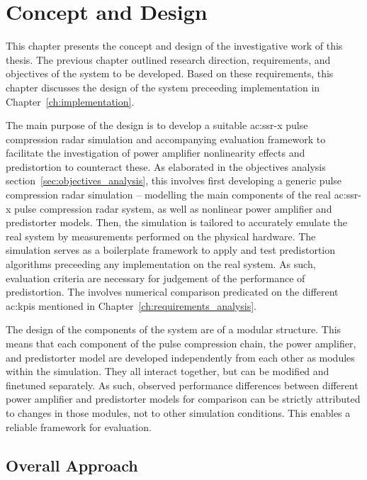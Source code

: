 %
\chapter{Concept and Design}\label{ch:concept_and_design}

This chapter presents the concept and design of the investigative work of this thesis. The previous chapter outlined research direction, requirements, and objectives of the system to be developed. Based on these requirements, this chapter discusses the design of the system preceeding implementation in Chapter~\ref{ch:implementation}. 

The main purpose of the design is to develop a suitable \gls{ac:ssr-x} pulse compression radar simulation and accompanying evaluation framework to facilitate the investigation of power amplifier nonlinearity effects and predistortion to counteract these. As elaborated in the objectives analysis section~\ref{sec:objectives_analysis}, this involves first developing a generic pulse compression radar simulation -- modelling the main components of the real \gls{ac:ssr-x} pulse compression radar system, as well as nonlinear power amplifier and predistorter models. Then, the simulation is tailored to accurately emulate the real system by measurements performed on the physical hardware. The simulation serves as a boilerplate framework to apply and test predistortion algorithms preceeding any implementation on the real system. As such, evaluation criteria are necessary for judgement of the performance of predistortion. The involves numerical comparison predicated on the different \glspl{ac:kpi} mentioned in Chapter~\ref{ch:requirements_analysis}. 

The design of the components of the system are of a modular structure. This means that each component of the pulse compression chain, the power amplifier, and predistorter model are developed independently from each other as modules within the simulation. They all interact together, but can be modified and finetuned separately. As such, observed performance differences between different power amplifier and predistorter models for comparison can be strictly attributed to changes in those modules, not to other simulation conditions. This enables a reliable framework for evaluation.

\section{Overall Approach}

